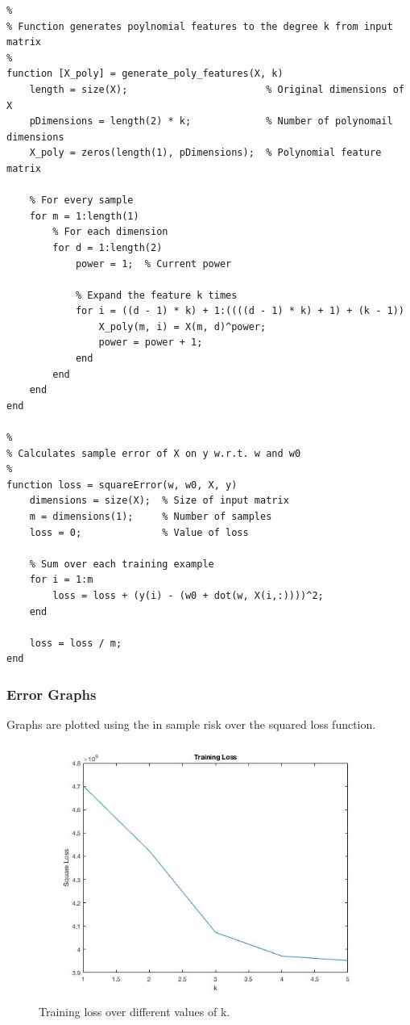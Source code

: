 \documentclass[11pt, oneside]{article}   	%
\begin{document}
\begin{verbatim}
%
% Function generates poylnomial features to the degree k from input matrix
%
function [X_poly] = generate_poly_features(X, k)
    length = size(X);                        % Original dimensions of X
    pDimensions = length(2) * k;             % Number of polynomail dimensions
    X_poly = zeros(length(1), pDimensions);  % Polynomial feature matrix
    
    % For every sample
    for m = 1:length(1)
        % For each dimension
        for d = 1:length(2)
            power = 1;  % Current power
            
            % Expand the feature k times
            for i = ((d - 1) * k) + 1:((((d - 1) * k) + 1) + (k - 1))
                X_poly(m, i) = X(m, d)^power;
                power = power + 1;
            end
        end
    end
end

%
% Calculates sample error of X on y w.r.t. w and w0
%
function loss = squareError(w, w0, X, y)
    dimensions = size(X);  % Size of input matrix
    m = dimensions(1);     % Number of samples
    loss = 0;              % Value of loss
    
    % Sum over each training example
    for i = 1:m
        loss = loss + (y(i) - (w0 + dot(w, X(i,:))))^2;
    end
    
    loss = loss / m;
end
\end{verbatim}
\subsubsection{Error Graphs}
Graphs are plotted using the in sample risk over the squared loss function.

\begin{figure}
  \includegraphics[width=\linewidth]{train-loss.jpg}
  \caption{Training loss over different values of k.}
\end{figure}
\end{document}
